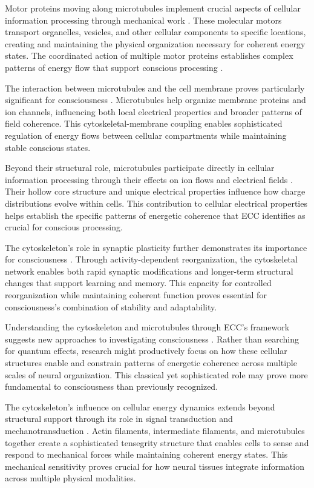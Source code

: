 \begin{refsection}
Motor proteins moving along microtubules implement crucial aspects of cellular information processing through mechanical work \cite{Kueh2009}. These molecular motors transport organelles, vesicles, and other cellular components to specific locations, creating and maintaining the physical organization necessary for coherent energy states. The coordinated action of multiple motor proteins establishes complex patterns of energy flow that support conscious processing \cite{Kirschner1986}.

The interaction between microtubules and the cell membrane proves particularly significant for consciousness \cite{Wittmann2001}. Microtubules help organize membrane proteins and ion channels, influencing both local electrical properties and broader patterns of field coherence. This cytoskeletal-membrane coupling enables sophisticated regulation of energy flows between cellular compartments while maintaining stable conscious states.

Beyond their structural role, microtubules participate directly in cellular information processing through their effects on ion flows and electrical fields \cite{Dent2014}. Their hollow core structure and unique electrical properties influence how charge distributions evolve within cells. This contribution to cellular electrical properties helps establish the specific patterns of energetic coherence that ECC identifies as crucial for conscious processing.

The cytoskeleton's role in synaptic plasticity further demonstrates its importance for consciousness \cite{Kapitein2015}. Through activity-dependent reorganization, the cytoskeletal network enables both rapid synaptic modifications and longer-term structural changes that support learning and memory. This capacity for controlled reorganization while maintaining coherent function proves essential for consciousness's combination of stability and adaptability.

Understanding the cytoskeleton and microtubules through ECC's framework suggests new approaches to investigating consciousness \cite{Nogales2000}. Rather than searching for quantum effects, research might productively focus on how these cellular structures enable and constrain patterns of energetic coherence across multiple scales of neural organization. This classical yet sophisticated role may prove more fundamental to consciousness than previously recognized.

The cytoskeleton's influence on cellular energy dynamics extends beyond structural support through its role in signal transduction and mechanotransduction \cite{Fletcher2010}. Actin filaments, intermediate filaments, and microtubules together create a sophisticated tensegrity structure that enables cells to sense and respond to mechanical forces while maintaining coherent energy states. This mechanical sensitivity proves crucial for how neural tissues integrate information across multiple physical modalities.


\end{refsection}
